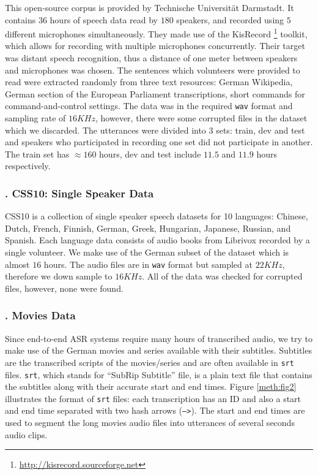 This open-source corpus \cite{radeck2015open} is provided by Technische Universit{\"a}t Darmstadt. It contains $36$ hours of speech data read by $180$ speakers, and recorded using $5$ different microphones simultaneously. They made use of the KisRecord \footnote{\url{http://kisrecord.sourceforge.net}} toolkit, which allows for recording with multiple microphones concurrently. Their target was distant speech recognition, thus a distance of one meter between speakers and microphones was chosen. The sentences which volunteers were provided to read were extracted randomly from three text resources: German Wikipedia, German section of the European Parliament transcriptions, short commands for command-and-control settings. The data was in the required \texttt{wav} format and sampling rate of $16 KHz$, however, there were some corrupted files in the dataset which we discarded. The utterances were divided into 3 sets: train, dev and test and speakers who participated in recording one set did not participate in another. The train set has $\approx160$ hours, dev and test include $11.5$ and $11.9$ hours respectively.   

\subsubsection{. CSS10: Single Speaker Data}
\label{meth:s2_sub4_subsub4}

CSS10 is a collection of single speaker speech datasets for 10 languages: Chinese, Dutch, French, Finnish, German, Greek, Hungarian, Japanese, Russian, and Spanish. Each language data consists of audio books from Librivox recorded by a single volunteer. We make use of the German subset of the dataset which is almost $16$ hours. The audio files are in \texttt{wav} format but sampled at $22 KHz$, therefore we down sample to $16 KHz$. All of the data was checked for corrupted files, however, none were found.

\subsubsection{. Movies Data}
\label{meth:s2_sub4_subsub5}


Since end-to-end \ac{ASR} systems require many hours of transcribed audio, we try to make use of the German movies and series available with their subtitles. Subtitles are the transcribed scripts of the movies/series and are often available in \texttt{srt} files. \texttt{srt}, which stands for \enquote{SubRip Subtitle} file, is a plain text file that contains the subtitles along with their accurate start and end times. Figure \ref{meth:fig2} illustrates the format of \texttt{srt} files: each transcription has an ID and also a start and end time separated with two hash arrows (\texttt{-->}). The start and end times are used to segment the long movies audio files into utterances of several seconds audio clips. 


